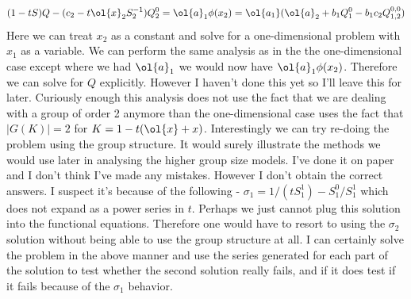 \[
	(1-tS)Q - (c_2 -t\ol{x}_2 S_2^{-1})Q_2^0  = \ol{a}_1\phi(x_2) = \ol{a_1}(\ol{a}_2 + b_1 Q_1^0 -b_1c_2Q_{1,2}^{0,0})
\]
Here we can treat $x_2$ as a constant and solve for a one-dimensional problem with $x_1$ as a variable. We can perform the same analysis as in the the one-dimensional case except where we had $\ol{a}_1$ we would now have $\ol{a}_1 \phi(x_2)$. Therefore we can solve for $Q$ explicitly. However I haven't done this yet so I'll leave this for later. Curiously enough this analysis does not use the fact that we are dealing with a group of order 2 anymore than the one-dimensional case uses the fact that $|G(K)| = 2$ for $K = 1 - t(\ol{x}+x)$. Interestingly we can try re-doing the problem using the group structure. It would surely illustrate the methods we would use later in analysing the higher group size models. I've done it on paper and I don't think I've made any mistakes. However I don't obtain the correct answers. I suspect it's because of the following - $\sigma_1 = 1/(tS_1^1) - S_1^0/S_1^1$ which does not expand as a power series in $t$. Perhaps we just cannot plug this solution into the functional equations. Therefore one would have to resort to using the $\sigma_2$ solution without being able to use the group structure at all. I can certainly solve the problem in the above manner and use the series generated for each part of the solution to test whether the second solution really fails, and if it does test if it fails because of the $\sigma_1$ behavior.

\endinput
